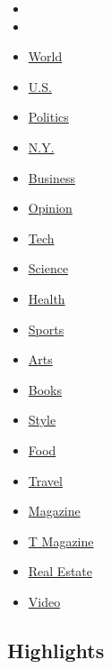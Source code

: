 \begin{itemize}
\item
\item
\item
  \href{https://www.nytimes3xbfgragh.onion/section/world}{World}
\item
  \href{https://www.nytimes3xbfgragh.onion/section/us}{U.S.}
\item
  \href{https://www.nytimes3xbfgragh.onion/section/politics}{Politics}
\item
  \href{https://www.nytimes3xbfgragh.onion/section/nyregion}{N.Y.}
\item
  \href{https://www.nytimes3xbfgragh.onion/section/business}{Business}
\item
  \href{https://www.nytimes3xbfgragh.onion/section/opinion}{Opinion}
\item
  \href{https://www.nytimes3xbfgragh.onion/section/technology}{Tech}
\item
  \href{https://www.nytimes3xbfgragh.onion/section/science}{Science}
\item
  \href{https://www.nytimes3xbfgragh.onion/section/health}{Health}
\item
  \href{https://www.nytimes3xbfgragh.onion/section/sports}{Sports}
\item
  \href{https://www.nytimes3xbfgragh.onion/section/arts}{Arts}
\item
  \href{https://www.nytimes3xbfgragh.onion/section/books}{Books}
\item
  \href{https://www.nytimes3xbfgragh.onion/section/style}{Style}
\item
  \href{https://www.nytimes3xbfgragh.onion/section/food}{Food}
\item
  \href{https://www.nytimes3xbfgragh.onion/section/travel}{Travel}
\item
  \href{https://www.nytimes3xbfgragh.onion/section/magazine}{Magazine}
\item
  \href{https://www.nytimes3xbfgragh.onion/section/t-magazine}{T
  Magazine}
\item
  \href{https://www.nytimes3xbfgragh.onion/section/realestate}{Real
  Estate}
\item
  \href{https://www.nytimes3xbfgragh.onion/video}{Video}
\end{itemize}

\hypertarget{highlights}{%
\subsection{Highlights}\label{highlights}}

